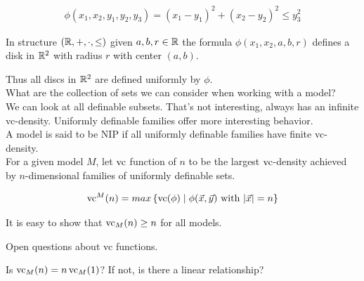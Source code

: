\documentclass{amsart}
\newcommand{\curly}[1]{\left\{ #1 \right\}}
\begin{document}
\begin{Example}
	\begin{align*}
		\phi(x_1, x_2, y_1, y_2, y_3) = (x_1 - y_1)^2 + (x_2 - y_2)^2 \leq y_3^2
	\end{align*}
\end{Example}

In structure $(\mathbb{R}, +, \cdot, \leq)$ given $a,b,r \in \mathbb{R}$ the formula $\phi(x_1, x_2, a, b, r)$ defines a disk in $\mathbb{R}^2$ with radius $r$ with center $(a,b)$.

Thus all discs in $\mathbb{R}^2$ are defined uniformly by $\phi$. \\

What are the collection of sets we can consider when working with a model? \\

We can look at all definable subsets. That's not interesting, always has an infinite vc-density.
Uniformly definable families offer more interesting behavior. \\

A model is said to be NIP if all uniformly definable families have finite vc-density. \\

For a given model $M$, let $\operatorname{vc}$ function of $n$ to be the largest $\operatorname{vc}$-density achieved by $n$-dimensional families of uniformly definable sets.

\begin{align*}
	\vc^M(n) = max \curly{ \vc(\phi) \mid \phi(\vec x, \vec y) \text{ with } |\vec x| = n}
\end{align*}

It is easy to show that $\operatorname{vc}_M(n) \geq n$ for all models.

Open questions about vc functions.

Is $\operatorname{vc}_M(n) = n \operatorname{vc}_M(1)$? If not, is there a linear relationship?
\end{document}
